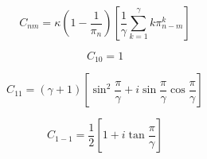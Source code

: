 \documentclass[a4paper,12pt,twoside]{article}
\begin{document}
\begin{equation}
\label{eq:cnm3}
C_{nm}=\kappa(1-\frac{1}{\pi_{n}})[\frac{1}{\gamma}\sum_{k=1}^{\gamma}k\pi_{n-m}^{k}]
\end{equation}

\begin{equation}
\label{eq:c10}
C_{10}=1
\end{equation}

\begin{equation}
\label{eq:c11}
C_{11}=(\gamma +1 )[\sin^2\frac{\pi}{\gamma}+i\sin\frac{\pi}{\gamma}\cos\frac{\pi}{\gamma}]
\end{equation}

\begin{equation}
\label{eq:c11}
C_{1-1}=\frac{1}{2}[1+i\tan\frac{\pi}{\gamma}]
\end{equation}
\end{document}
